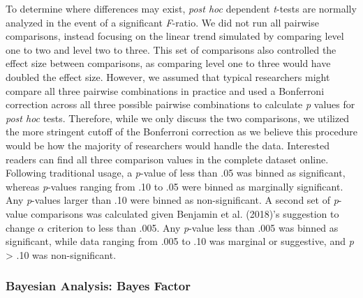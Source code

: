 \documentclass[english,mask,man]{apa6}
\theoremstyle{definition}
\theoremstyle{definition}
\theoremstyle{definition}
\theoremstyle{remark}
\begin{document}
To determine where differences may exist, \emph{post hoc} dependent
\emph{t}-tests are normally analyzed in the event of a significant
\emph{F}-ratio. We did not run all pairwise comparisons, instead
focusing on the linear trend simulated by comparing level one to two and
level two to three. This set of comparisons also controlled the effect
size between comparisons, as comparing level one to three would have
doubled the effect size. However, we assumed that typical researchers
might compare all three pairwise combinations in practice and used a
Bonferroni correction across all three possible pairwise combinations to
calculate \emph{p} values for \emph{post hoc} tests. Therefore, while we
only discuss the two comparisons, we utilized the more stringent cutoff
of the Bonferroni correction as we believe this procedure would be how
the majority of researchers would handle the data. Interested readers
can find all three comparison values in the complete dataset online.
Following traditional usage, a \emph{p}-value of less than .05 was
binned as significant, whereas \emph{p}-values ranging from .10 to .05
were binned as marginally significant. Any \emph{p}-values larger than
.10 were binned as non-significant. A second set of \emph{p}-value
comparisons was calculated given Benjamin et al. (2018)'s suggestion to
change \(\alpha\) criterion to less than .005. Any \emph{p}-value less
than .005 was binned as significant, while data ranging from .005 to .10
was marginal or suggestive, and \emph{p} \textgreater{} .10 was
non-significant.

\subsubsection{Bayesian Analysis: Bayes
Factor}\label{bayesian-analysis-bayes-factor}
\end{document}
